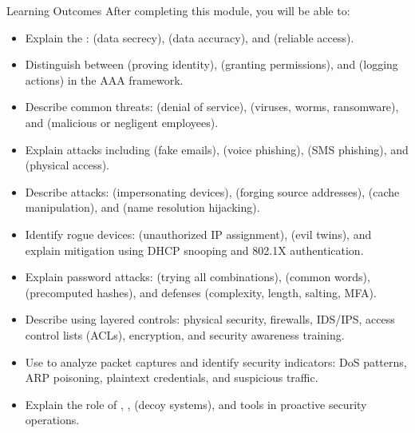\documentclass[aspectratio=169]{beamer}  %
\begin{document}
\begin{frame}[t,allowframebreaks]{Learning Outcomes}
    After completing this module, you will be able to:
    \vspace{0.5em}
    \small
    \begin{itemize}
        \item Explain the :  (data secrecy),  (data accuracy), and  (reliable access).
        \item Distinguish between  (proving identity),  (granting permissions), and  (logging actions) in the AAA framework.
        \item Describe common threats:  (denial of service),  (viruses, worms, ransomware), and  (malicious or negligent employees).
        \item Explain  attacks including  (fake emails),  (voice phishing),  (SMS phishing), and  (physical access).
        \item Describe  attacks:  (impersonating devices),  (forging source addresses),  (cache manipulation), and  (name resolution hijacking).
        \item Identify rogue devices:  (unauthorized IP assignment),  (evil twins), and explain mitigation using DHCP snooping and 802.1X authentication.
        \item Explain password attacks:  (trying all combinations),  (common words),  (precomputed hashes), and defenses (complexity, length, salting, MFA).
        \item Describe  using layered controls: physical security, firewalls, IDS/IPS, access control lists (ACLs), encryption, and security awareness training.
        \item Use  to analyze packet captures and identify security indicators: DoS patterns, ARP poisoning, plaintext credentials, and suspicious traffic.
        \item Explain the role of , ,  (decoy systems), and  tools in proactive security operations.
    \end{itemize}
\end{frame}
\end{document}
